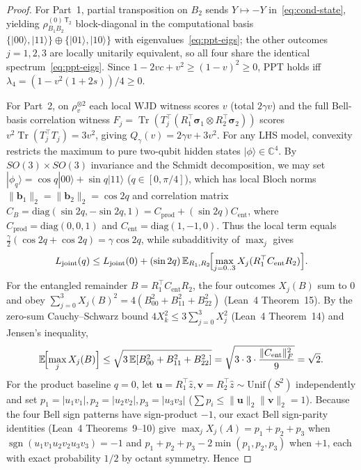 \documentclass[11pt,a4paper]{article}
\theoremstyle{definition}
\theoremstyle{remark}
\newcommand{\CC}{\mathbb{C}}
\newcommand{\Tr}{\operatorname{Tr}}
\newcommand{\sgn}{\operatorname{sgn}}
\begin{document}
\begin{proof}
For Part~1, partial transposition on $B_2$ sends $Y \mapsto -Y$ in~\eqref{eq:cond-state}, yielding $\rho_{B_1 B_2}^{(0)\,\mathsf{T}_2}$ block-diagonal in the computational basis $\{|00\rangle,|11\rangle\} \oplus \{|01\rangle,|10\rangle\}$ with eigenvalues~\eqref{eq:ppt-eigs}; the other outcomes $j=1,2,3$ are locally unitarily equivalent, so all four share the identical spectrum~\eqref{eq:ppt-eigs}. Since $1 - 2vc + v^2 \ge (1-v)^2 \ge 0$, PPT holds iff $\lambda_4 = (1 - v^2(1+2s))/4 \ge 0$.

For Part~2, on $\rho_v^{\otimes 2}$ each local WJD witness scores $v$ (total $2\gamma v$) and the full Bell-basis correlation witness $F_j = \Tr(T_j^\top (R_1^\top\boldsymbol{\sigma}_1 \otimes R_2^\top\boldsymbol{\sigma}_2))$ scores $v^2\Tr(T_j^\top T_j) = 3 v^2$, giving $Q_\gamma(v) = 2\gamma v + 3v^2$. For any LHS model, convexity restricts the maximum to pure two-qubit hidden states $|\phi\rangle \in \CC^4$. By $SO(3)\times SO(3)$ invariance and the Schmidt decomposition, we may set $|\phi_q\rangle = \cos q|00\rangle + \sin q|11\rangle$ ($q \in [0,\pi/4]$), which has local Bloch norms $\|\mathbf{b}_1\|_2 = \|\mathbf{b}_2\|_2 = \cos 2q$ and correlation matrix $C_B = \mathrm{diag}(\sin 2q, -\sin 2q, 1) = C_{\mathrm{prod}} + (\sin 2q) C_{\mathrm{ent}}$, where $C_{\mathrm{prod}} = \mathrm{diag}(0,0,1)$ and $C_{\mathrm{ent}} = \mathrm{diag}(1,-1,0)$. Thus the local term equals $\frac{\gamma}{2}(\cos 2q + \cos 2q) = \gamma\cos 2q$, while subadditivity of $\max_j$ gives
\[
  L_{\mathrm{joint}}(q) \le L_{\mathrm{joint}}(0) + (\sin 2q)\,\mathbb{E}_{R_1,R_2}\!\Bigl[\max_{j=0..3} X_j(R_1^\top C_{\mathrm{ent}} R_2)\Bigr].
\]
For the entangled remainder $B = R_1^\top C_{\mathrm{ent}} R_2$, the four outcomes $X_j(B)$ sum to $0$ and obey $\sum_{j=0}^3 X_j(B)^2 = 4(B_{00}^2 + B_{11}^2 + B_{22}^2)$ (Lean~4 Theorem~15). By the zero-sum Cauchy--Schwarz bound $4 X_k^2 \le 3\sum_{j=0}^3 X_j^2$ (Lean~4 Theorem~14) and Jensen's inequality,
\[
  \mathbb{E}\!\Bigl[\max_j X_j(B)\Bigr] \le \sqrt{3\,\mathbb{E}[B_{00}^2 + B_{11}^2 + B_{22}^2]} = \sqrt{3 \cdot 3 \cdot \frac{\|C_{\mathrm{ent}}\|_F^2}{9}} = \sqrt{2}.
\]
For the product baseline $q=0$, let $\mathbf{u} = R_1^\top \hat{z}, \mathbf{v} = R_2^\top \hat{z} \sim \mathrm{Unif}(S^2)$ independently and set $p_1 = |u_1 v_1|, p_2 = |u_2 v_2|, p_3 = |u_3 v_3|$ ($\sum p_i \le \|\mathbf{u}\|_2\|\mathbf{v}\|_2 = 1$). Because the four Bell sign patterns have sign-product $-1$, our exact Bell sign-parity identities (Lean~4 Theorems~9--10) give $\max_j X_j(A) = p_1+p_2+p_3$ when $\sgn(u_1 v_1 u_2 v_2 u_3 v_3) = -1$ and $p_1+p_2+p_3 - 2\min(p_1,p_2,p_3)$ when $+1$, each with exact probability $1/2$ by octant symmetry. Hence

\end{proof}
\end{document}
